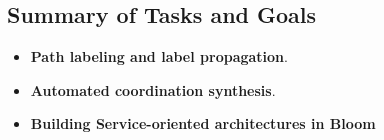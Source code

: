\subsection{Summary of Tasks and Goals}



\begin{itemize}
\item \textbf{Path labeling and label propagation}.  
\item \textbf{Automated coordination synthesis}.
\item \textbf{Building Service-oriented architectures in Bloom}
\end{itemize}

